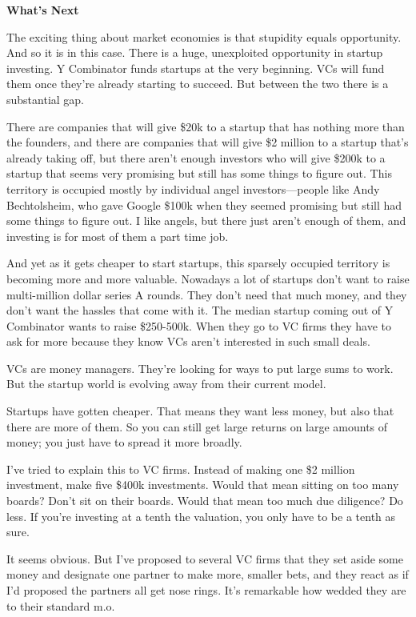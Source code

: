 \textbf{What's Next}

The exciting thing about market economies is that stupidity equals
opportunity. And so it is in this case. There is a huge, unexploited
opportunity in startup investing. Y Combinator funds startups at the
very beginning. VCs will fund them once they're already starting to
succeed. But between the two there is a substantial gap.

There are companies that will give \$20k to a startup that has nothing
more than the founders, and there are companies that will give \$2
million to a startup that's already taking off, but there aren't enough
investors who will give \$200k to a startup that seems very promising
but still has some things to figure out. This territory is occupied
mostly by individual angel investors---people like Andy Bechtolsheim,
who gave Google \$100k when they seemed promising but still had some
things to figure out. I like angels, but there just aren't enough of
them, and investing is for most of them a part time job.

And yet as it gets cheaper to start startups, this sparsely occupied
territory is becoming more and more valuable. Nowadays a lot of startups
don't want to raise multi-million dollar series A rounds. They don't
need that much money, and they don't want the hassles that come with it.
The median startup coming out of Y Combinator wants to raise \$250-500k.
When they go to VC firms they have to ask for more because they know VCs
aren't interested in such small deals.

VCs are money managers. They're looking for ways to put large sums to
work. But the startup world is evolving away from their current model.

Startups have gotten cheaper. That means they want less money, but also
that there are more of them. So you can still get large returns on large
amounts of money; you just have to spread it more broadly.

I've tried to explain this to VC firms. Instead of making one \$2
million investment, make five \$400k investments. Would that mean
sitting on too many boards? Don't sit on their boards. Would that mean
too much due diligence? Do less. If you're investing at a tenth the
valuation, you only have to be a tenth as sure.

It seems obvious. But I've proposed to several VC firms that they set
aside some money and designate one partner to make more, smaller bets,
and they react as if I'd proposed the partners all get nose rings. It's
remarkable how wedded they are to their standard m.o.

